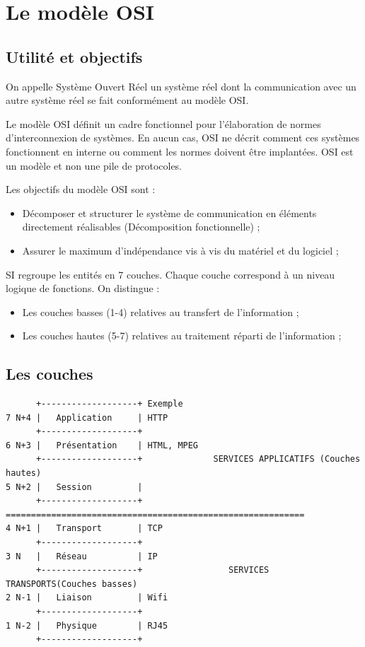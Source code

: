 \section{Le modèle OSI}
\subsection{Utilité et objectifs}
On appelle Système Ouvert Réel un système réel dont la communication avec un autre système réel se fait conformément au modèle OSI.

Le modèle OSI définit un cadre fonctionnel pour l'élaboration de normes d'interconnexion de systèmes. En aucun cas, OSI ne décrit comment ces systèmes fonctionnent en interne ou comment les normes doivent être implantées. OSI est un modèle et non une pile de protocoles.

Les objectifs du modèle OSI sont :
\begin{itemize}
	\item Décomposer et structurer le système de communication en éléments directement réalisables (Décomposition fonctionnelle) ;
	\item Assurer le maximum d'indépendance vis à vis du matériel et du logiciel ;
\end{itemize}

SI regroupe les entités en 7 couches. Chaque couche correspond à un niveau logique de fonctions. On distingue :
\begin{itemize}
	\item Les couches basses (1-4) relatives au transfert de l'information ;
	\item Les couches hautes (5-7) relatives au traitement réparti de l'information ;
\end{itemize}

\newpage
\subsection{Les couches}
\begin{verbatim}
      +-------------------+ Exemple  
7 N+4 |   Application     | HTTP   
      +-------------------+     
6 N+3 |   Présentation    | HTML, MPEG     
      +-------------------+              SERVICES APPLICATIFS (Couches hautes)
5 N+2 |   Session         |   
      +-------------------+ ===========================================================
4 N+1 |   Transport       | TCP 
      +-------------------+    
3 N   |   Réseau          | IP    
      +-------------------+                 SERVICES TRANSPORTS(Couches basses)
2 N-1 |   Liaison         | Wifi    
      +-------------------+    
1 N-2 |   Physique        | RJ45  
      +-------------------+  
\end{verbatim}
